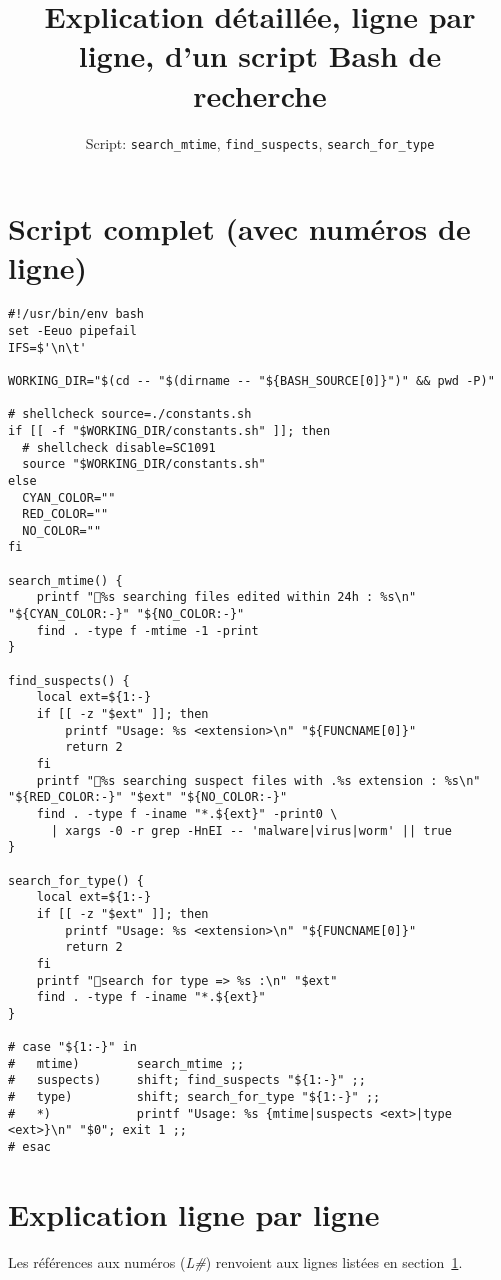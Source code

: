 \documentclass[11pt,a4paper]{article}
\title{Explication détaillée, ligne par ligne, d'un script Bash de recherche}
\author{%
Script: \texttt{search\_mtime}, \texttt{find\_suspects}, \texttt{search\_for\_type}
}
\date{}
\begin{document}
\maketitle
\tableofcontents

\section{Script complet (avec numéros de ligne)}
\label{sec:script}
\begin{lstlisting}
#!/usr/bin/env bash
set -Eeuo pipefail
IFS=$'\n\t'

WORKING_DIR="$(cd -- "$(dirname -- "${BASH_SOURCE[0]}")" && pwd -P)"

# shellcheck source=./constants.sh
if [[ -f "$WORKING_DIR/constants.sh" ]]; then
  # shellcheck disable=SC1091
  source "$WORKING_DIR/constants.sh"
else
  CYAN_COLOR=""
  RED_COLOR=""
  NO_COLOR=""
fi

search_mtime() {
    printf "🚀%s searching files edited within 24h : %s\n" "${CYAN_COLOR:-}" "${NO_COLOR:-}"
    find . -type f -mtime -1 -print
}

find_suspects() {
    local ext=${1:-}
    if [[ -z "$ext" ]]; then
        printf "Usage: %s <extension>\n" "${FUNCNAME[0]}"
        return 2
    fi
    printf "🚀%s searching suspect files with .%s extension : %s\n" "${RED_COLOR:-}" "$ext" "${NO_COLOR:-}"
    find . -type f -iname "*.${ext}" -print0 \
      | xargs -0 -r grep -HnEI -- 'malware|virus|worm' || true
}

search_for_type() {
    local ext=${1:-}
    if [[ -z "$ext" ]]; then
        printf "Usage: %s <extension>\n" "${FUNCNAME[0]}"
        return 2
    fi
    printf "🚀search for type => %s :\n" "$ext"
    find . -type f -iname "*.${ext}"
}

# case "${1:-}" in
#   mtime)        search_mtime ;;
#   suspects)     shift; find_suspects "${1:-}" ;;
#   type)         shift; search_for_type "${1:-}" ;;
#   *)            printf "Usage: %s {mtime|suspects <ext>|type <ext>}\n" "$0"; exit 1 ;;
# esac
\end{lstlisting}

\section{Explication ligne par ligne}
Les références aux numéros (\emph{L\#}) renvoient aux lignes listées en section~\ref{sec:script}.
\end{document}
